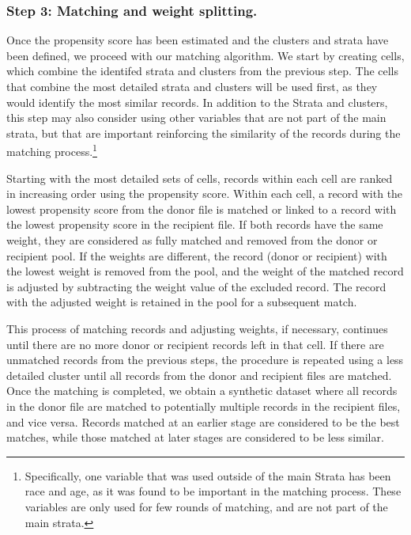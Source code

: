 \documentclass[
  11pt,
]{article}
\begin{document}
\subsubsection{Step 3: Matching and weight
splitting.}\label{step-3-matching-and-weight-splitting.}

Once the propensity score has been estimated and the clusters and strata
have been defined, we proceed with our matching algorithm. We start by
creating cells, which combine the identifed strata and clusters from the
previous step. The cells that combine the most detailed strata and
clusters will be used first, as they would identify the most similar
records. In addition to the Strata and clusters, this step may also
consider using other variables that are not part of the main strata, but
that are important reinforcing the similarity of the records during the
matching process.\footnote{Specifically, one variable that was used
  outside of the main Strata has been race and age, as it was found to
  be important in the matching process. These variables are only used
  for few rounds of matching, and are not part of the main strata.}

Starting with the most detailed sets of cells, records within each cell
are ranked in increasing order using the propensity score. Within each
cell, a record with the lowest propensity score from the donor file is
matched or linked to a record with the lowest propensity score in the
recipient file. If both records have the same weight, they are
considered as fully matched and removed from the donor or recipient
pool. If the weights are different, the record (donor or recipient) with
the lowest weight is removed from the pool, and the weight of the
matched record is adjusted by subtracting the weight value of the
excluded record. The record with the adjusted weight is retained in the
pool for a subsequent match.

This process of matching records and adjusting weights, if necessary,
continues until there are no more donor or recipient records left in
that cell. If there are unmatched records from the previous steps, the
procedure is repeated using a less detailed cluster until all records
from the donor and recipient files are matched. Once the matching is
completed, we obtain a synthetic dataset where all records in the donor
file are matched to potentially multiple records in the recipient files,
and vice versa. Records matched at an earlier stage are considered to be
the best matches, while those matched at later stages are considered to
be less similar.
\end{document}
